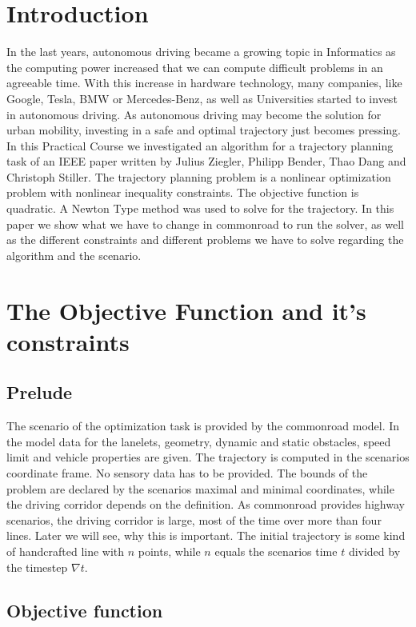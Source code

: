 \documentclass[conference]{IEEEtran}
\begin{document}
\section{Introduction}
In the last years, autonomous driving became a growing  topic in Informatics as the computing power increased that we can compute difficult problems in an agreeable time.
With this increase in hardware technology, many companies, like Google, Tesla, BMW or Mercedes-Benz, as well as Universities started to invest in autonomous driving. As autonomous driving may become the solution for urban mobility, investing in a safe and optimal trajectory just becomes pressing. In this Practical Course we investigated an algorithm for a trajectory planning task of an IEEE paper written by Julius Ziegler, Philipp Bender, Thao Dang and Christoph Stiller. The trajectory planning problem is a nonlinear optimization problem with nonlinear inequality constraints. The objective function is quadratic. A Newton Type method was used to solve for the trajectory. In this paper we show what we have to change in commonroad to run the solver, as well as the different constraints and different problems we have to solve regarding the algorithm and the scenario. 

\section{The Objective Function and it's constraints}
\subsection{Prelude}
The scenario of the optimization task is provided by the commonroad model. In the model data for the lanelets, geometry, dynamic and static obstacles, speed limit and vehicle properties are given. The trajectory is computed in the scenarios coordinate frame. No sensory data has to be provided. The bounds of the problem are declared by the scenarios maximal and minimal coordinates, while the driving corridor depends on the definition. As commonroad provides highway scenarios, the driving corridor is large, most of the time over more than four lines. Later we will see, why this is important. The initial trajectory is some kind of handcrafted line with $n$ points, while $n$ equals the scenarios time $t$ divided by the timestep $\nabla t$.

\subsection{Objective function}
\end{document}
